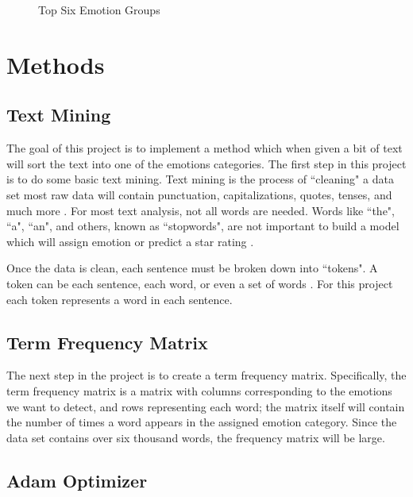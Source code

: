 \documentclass[titlepage,letterpaper]{article}
\begin{document}
 

 \begin{figure}[htb]
		\centering
 		\caption{Top Six Emotion Groups}
 		
 		\label{topsixgroups}
 \end{figure}
 	
 
\section{Methods}

\subsection{Text Mining}
The goal of this project is to implement a method which when given a bit of text will sort the text into one of the emotions categories. The first step in this project is to do some basic text mining. Text mining is the process of ``cleaning" a data set most raw data will contain punctuation, capitalizations, quotes, tenses, and much more \cite{TextMining}. For most text analysis, not all words are needed. Words like ``the", ``a", ``an", and others, known as ``stopwords", are not important to build a model which will assign emotion or predict a star rating \cite{TextMining}. 

Once the data is clean, each sentence must be broken down into ``tokens". A token can be each sentence, each word, or even a set of words \cite{TextMining}. For this project each token represents a word in each sentence. 

\subsection{Term Frequency Matrix}
The next step in the project is to create a term frequency matrix. Specifically, the term frequency matrix is a matrix with columns corresponding to the emotions we want to detect, and rows representing each word; the matrix itself will contain the number of times a word appears in the assigned emotion category. Since the data set contains over six thousand words, the frequency matrix will be large.

\subsection{Adam Optimizer}
\end{document}

